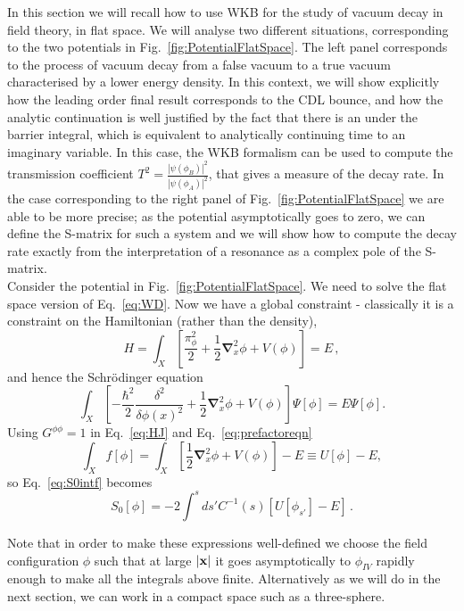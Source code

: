 \documentclass[a4paper,11pt]{article}
\numberwithin{equation}{section}
\begin{document}
In this section we will recall how to use WKB for the study of vacuum decay in field theory, in flat space. We will analyse two different situations, corresponding to the two potentials in Fig.~\ref{fig:PotentialFlatSpace}. The left panel corresponds to the process of vacuum decay from a false vacuum to a true vacuum characterised by a lower energy density. In this context, we will show explicitly how the leading order final result corresponds to the CDL bounce, and how the analytic continuation is well justified by the fact that there is an under the barrier integral, which is equivalent to analytically continuing time to an imaginary variable. In this case, the WKB formalism can be used to compute the transmission coefficient $T^2 = \frac{|\psi(\phi_B)|^2}{|\psi(\phi_A)|^2}$, that gives a measure of the decay rate. In the case corresponding to the right panel of Fig.~\ref{fig:PotentialFlatSpace} we are able to be more precise; as the potential asymptotically goes to zero, we can define the S-matrix for such a system and we will show how to compute the decay rate exactly from the interpretation of a resonance as a complex pole of the S-matrix.\\

Consider the potential in Fig.~\ref{fig:PotentialFlatSpace}. We need to solve the flat space version of Eq.~\eqref{eq:WD}. Now we have a global constraint - classically it is a constraint on the Hamiltonian (rather than the density), 
\begin{equation}
H=\int_{X}\left[\frac{\pi_{\phi}^{2}}{2}+\frac{1}{2}\boldsymbol{\nabla}_{x}^{2}\phi+V(\phi)\right]=E \,,\label{eq:Hphi}
\end{equation}
 and hence the Schr\"odinger equation
\begin{equation}
\int_{X}\left[-\frac{\hbar^{2}}{2}\frac{\delta^{2}}{\delta\phi(x)^{2}}+\frac{1}{2}\boldsymbol{\nabla}_{x}^{2}\phi+V(\phi)\right]\Psi[\phi]=E\Psi[\phi].
\end{equation}
Using $G^{\phi\phi}=1$ in Eq.~\eqref{eq:HJ} and Eq.~\eqref{eq:prefactoreqn}
\begin{equation}
\int_{X}f[\phi]=\int_{X}\left[\frac{1}{2}\boldsymbol{\nabla}_{x}^{2}\phi+V(\phi)\right]-E\equiv U[\phi]-E,\label{eq:Uphi}
\end{equation}
so Eq.~\eqref{eq:S0intf} becomes 
\begin{equation}
S_{0}\left[\phi\right]=-2\int^{s}ds'C^{-1}(s)\left[U[\phi_{s'}]-E\right] \,.
\end{equation}

Note that in order to make these expressions well-defined we choose the field configuration $\phi$ such that at large $|{\bf x}|$ it goes asymptotically to $\phi_{IV}$ rapidly enough to make all the integrals above finite. Alternatively as we will do in the next section, we can work in a compact space such as a three-sphere.
\end{document}
